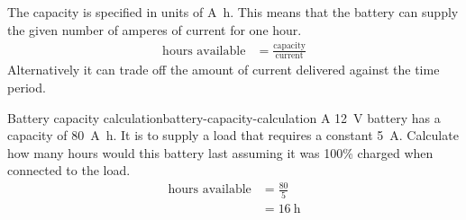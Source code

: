 \documentclass{pgnotes}
\begin{document}
The capacity is specified in units of \si{\ampere\hour}.
This means that the battery can supply the given number of amperes of current for one hour.
\begin{align}
  \mbox{hours available} & = \frac{\mbox{capacity}}{\mbox{current}}
\end{align}
Alternatively it can trade off the amount of current delivered against the time period.





\begin{example}{Battery capacity calculation}{battery-capacity-calculation}
  A \SI{12}{\volt} battery has a capacity of \SI{80}{\ampere\hour}.
  It is to supply a load that requires a constant \SI{5}{\ampere}.
  Calculate how many hours would this battery last assuming it was 100\% charged when connected to the load.
  \tcblower
  \begin{align}
    \mbox{hours available} & = \frac{80}{5} \\
                           & = \SI{16}{\hour} 
  \end{align}
\end{example}
\end{document}
